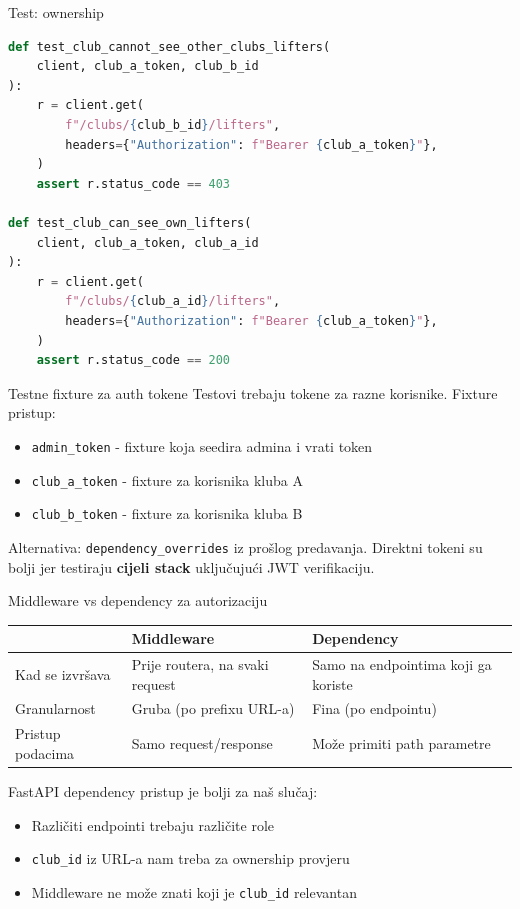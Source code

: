 \begin{frame}[fragile, shrink=10]{Test: ownership}
\begin{lstlisting}[language=python]
def test_club_cannot_see_other_clubs_lifters(
    client, club_a_token, club_b_id
):
    r = client.get(
        f"/clubs/{club_b_id}/lifters",
        headers={"Authorization": f"Bearer {club_a_token}"},
    )
    assert r.status_code == 403

def test_club_can_see_own_lifters(
    client, club_a_token, club_a_id
):
    r = client.get(
        f"/clubs/{club_a_id}/lifters",
        headers={"Authorization": f"Bearer {club_a_token}"},
    )
    assert r.status_code == 200
\end{lstlisting}
\end{frame}

\begin{frame}{Testne fixture za auth tokene}
Testovi trebaju tokene za razne korisnike. Fixture pristup:
\begin{itemize}
  \item \texttt{admin\_token} - fixture koja seedira admina i vrati token
  \item \texttt{club\_a\_token} - fixture za korisnika kluba A
  \item \texttt{club\_b\_token} - fixture za korisnika kluba B
\end{itemize}

\vspace{0.6em}
Alternativa: \texttt{dependency\_overrides} iz prošlog predavanja.
Direktni tokeni su bolji jer testiraju \textbf{cijeli stack} uključujući JWT verifikaciju.
\end{frame}

\begin{frame}{Middleware vs dependency za autorizaciju}
\begin{tabular}{@{}lp{5cm}p{5cm}@{}}
  \toprule
  & \textbf{Middleware} & \textbf{Dependency} \\
  \midrule
  Kad se izvršava & Prije routera, na svaki request & Samo na endpointima koji ga koriste \\
  Granularnost & Gruba (po prefixu URL-a) & Fina (po endpointu) \\
  Pristup podacima & Samo request/response & Može primiti path parametre \\
  \bottomrule
\end{tabular}

\vspace{0.6em}
FastAPI dependency pristup je bolji za naš slučaj:
\begin{itemize}
  \item Različiti endpointi trebaju različite role
  \item \texttt{club\_id} iz URL-a nam treba za ownership provjeru
  \item Middleware ne može znati koji je \texttt{club\_id} relevantan
\end{itemize}
\end{frame}

